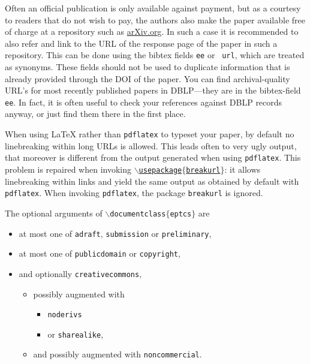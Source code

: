 \documentclass[submission,copyright,creativecommons]{eptcs}
\begin{document}
Often an official publication is only available against payment, but
as a courtesy to readers that do not wish to pay, the authors also
make the paper available free of charge at a repository such as
\url{arXiv.org}. In such a case it is recommended to also refer and
link to the URL of the response page of the paper in such a
repository.  This can be done using the bibtex fields {\tt ee} or {\tt
url}, which are treated as synonyms.  These fields should not be used
to duplicate information that is already provided through the DOI of
the paper.
You can find archival-quality URL's for most recently published papers
in DBLP---they are in the bibtex-field {\tt ee}. In fact, it is often
useful to check your references against DBLP records anyway, or just find
them there in the first place.

When using {\LaTeX} rather than {\tt pdflatex} to typeset your paper, by
default no linebreaking within long URLs is allowed. This leads often
to very ugly output, that moreover is different from the output
generated when using {\tt pdflatex}. This problem is repaired when
invoking \href{http://www.cse.unsw.edu.au/~rvg/EPTCS/breakurl.sty}
{\tt $\backslash$usepackage$\{$breakurl$\}$}: it allows linebreaking
within links and yield the same output as obtained by default with
{\tt pdflatex}. 
When invoking {\tt pdflatex}, the package {\tt breakurl} is ignored.

The optional arguments of {\tt $\backslash$documentclass$\{$eptcs$\}$} are
\begin{itemize}
\item at most one of
{\tt adraft},
{\tt submission} or
{\tt preliminary},
\item at most one of {\tt publicdomain} or {\tt copyright},
\item and optionally {\tt creativecommons},
  \begin{itemize}
  \item possibly augmented with
    \begin{itemize}
    \item {\tt noderivs}
    \item or {\tt sharealike},
    \end{itemize}
  \item and possibly augmented with {\tt noncommercial}.
  \end{itemize}
\end{itemize}




\end{document}
